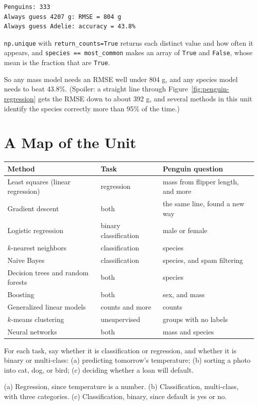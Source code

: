 \begin{verbatim}
Penguins: 333
Always guess 4207 g: RMSE = 804 g
Always guess Adelie: accuracy = 43.8%
\end{verbatim}

\verb|np.unique| with \verb|return_counts=True| returns each distinct value and how often it appears, and
\verb|species == most_common| makes an array of \verb|True| and \verb|False|, whose mean is the fraction that
are \verb|True|.

So any mass model needs an RMSE well under 804 g, and any species model needs to beat 43.8\%. (Spoiler: a
straight line through Figure~\ref{fig:penguin-regression} gets the RMSE down to about 392 g, and several
methods in this unit identify the species correctly more than 95\% of the time.)

\section{A Map of the Unit}
\begin{center}
\begin{tabular}{l l >{\raggedright\arraybackslash}p{4.2cm}}
\textbf{Method} & \textbf{Task} & \textbf{Penguin question} \\
\hline
Least squares (linear regression) & regression & mass from flipper length, and more \\
Gradient descent & both & the same line, found a new way \\
Logistic regression & binary classification & male or female \\
$k$-nearest neighbors & classification & species \\
Naive Bayes & classification & species, and spam filtering \\
Decision trees and random forests & both & species \\
Boosting & both & sex, and mass \\
Generalized linear models & counts and more & counts \\
$k$-means clustering & unsupervised & groups with no labels \\
Neural networks & both & mass and species \\
\end{tabular}
\end{center}

\begin{Exercise}[label=cr1, title=Name the task]
For each task, say whether it is classification or regression, and whether it is binary or multi-class:
(a) predicting tomorrow's temperature; (b) sorting a photo into cat, dog, or bird; (c) deciding whether a
loan will default.
\end{Exercise}
\begin{Answer}[ref=cr1]
(a) Regression, since temperature is a number. (b) Classification, multi-class, with three categories.
(c) Classification, binary, since default is yes or no.
\end{Answer}

